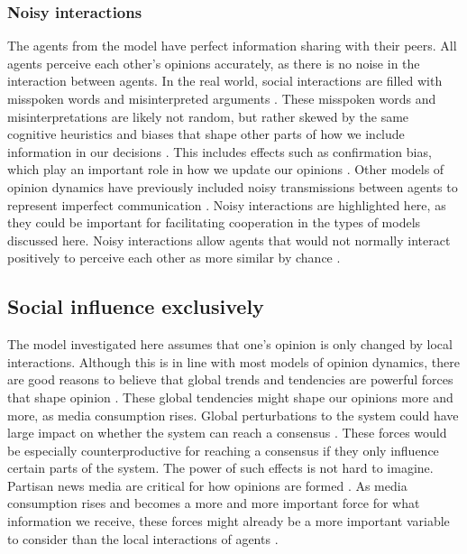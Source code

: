 \documentclass[11pt]{article}
\begin{document}
\subsubsection{Noisy interactions}

\noindent The agents from the model have perfect information sharing with their peers. All agents perceive each other's opinions accurately, as there is no noise in the interaction between agents. In the real world, social interactions are filled with misspoken words and misinterpreted arguments \cite{jussim_influence_1989}.
These misspoken words and misinterpretations are likely not random, but rather skewed by the same cognitive heuristics and biases that shape other parts of how we include information in our decisions \cite{arceneaux_cognitive_2012}. This includes effects such as confirmation bias, which play an important role in how we update our opinions \cite{allahverdyan_opinion_2014}. 
Other models of opinion dynamics have previously included noisy transmissions between agents to represent imperfect communication \cite{sirbu2017opinion,su_noise_2017}. Noisy interactions are highlighted here, as they could be important for facilitating cooperation in the types of models discussed here. Noisy interactions allow agents that would not normally interact positively to perceive each other as more similar by chance \cite{allahverdyan_opinion_2014,su_noise_2017}. 

\subsection{Social influence exclusively}
The model investigated here assumes that one's opinion is only changed by local interactions. Although this is in line with most models of opinion dynamics, there are good reasons to believe that global trends and tendencies are powerful forces that shape opinion \cite{bener_empirical_2016}. These global tendencies might shape our opinions more and more, as media consumption rises. Global perturbations to the system could have large impact on whether the system can reach a consensus \cite{macy2021polarization}. These forces would be especially counterproductive for reaching a consensus if they only influence certain parts of the system. The power of such effects is not hard to imagine. Partisan news media are critical for how opinions are formed \cite{pennycook_lazy_2019}. As media consumption rises and becomes a more and more important force for what information we receive, these forces might already be a more important variable to consider than the local interactions of agents \cite{bener_empirical_2016,stromback_dynamics_2013}. 
\end{document}
